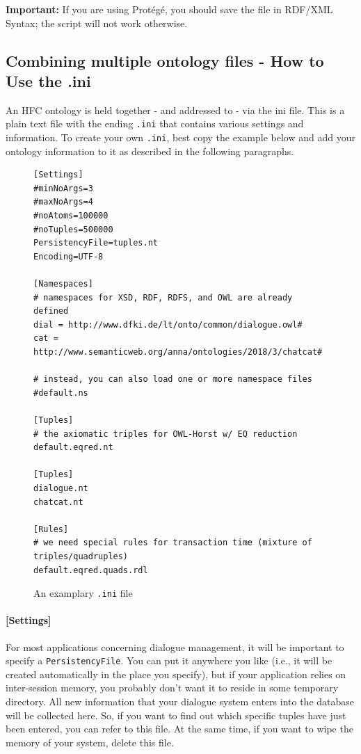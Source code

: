 \documentclass[a4paper]{report}
\begin{document}
\textbf{Important:} If you are using Prot\'eg\'e, you should save the file in RDF/XML Syntax; the script will not work otherwise.


\subsection{Combining multiple ontology files - How to Use the .ini}

An HFC ontology is held together - and addressed to - via the ini file. This is a plain text file with the ending \texttt{.ini} that contains various settings and information. To create your own \texttt{.ini}, best copy the example below and add your ontology information to it as described in the following paragraphs.

\begin{figure} [htbp]
\begin{verbatim}
[Settings]
#minNoArgs=3
#maxNoArgs=4
#noAtoms=100000
#noTuples=500000
PersistencyFile=tuples.nt
Encoding=UTF-8

[Namespaces]
# namespaces for XSD, RDF, RDFS, and OWL are already defined
dial = http://www.dfki.de/lt/onto/common/dialogue.owl#
cat = http://www.semanticweb.org/anna/ontologies/2018/3/chatcat#

# instead, you can also load one or more namespace files
#default.ns

[Tuples]
# the axiomatic triples for OWL-Horst w/ EQ reduction
default.eqred.nt

[Tuples]
dialogue.nt
chatcat.nt

[Rules]
# we need special rules for transaction time (mixture of triples/quadruples)
default.eqred.quads.rdl
\end{verbatim}
\caption{An examplary \texttt{.ini} file}
\label{fig:ini}
\end{figure}

\paragraph{[Settings]}

For most applications concerning dialogue management, it will be important to specify a \texttt{PersistencyFile}. You can put it anywhere you like (i.e., it will be created automatically in the place you specify), but if your application relies on inter-session memory, you probably don't want it to reside in some temporary directory. All new information that your dialogue system enters into the database will be collected here. So, if you want to find out which specific tuples have just been entered, you can refer to this file. At the same time, if you want to wipe the memory of your system, delete this file.
\end{document}
